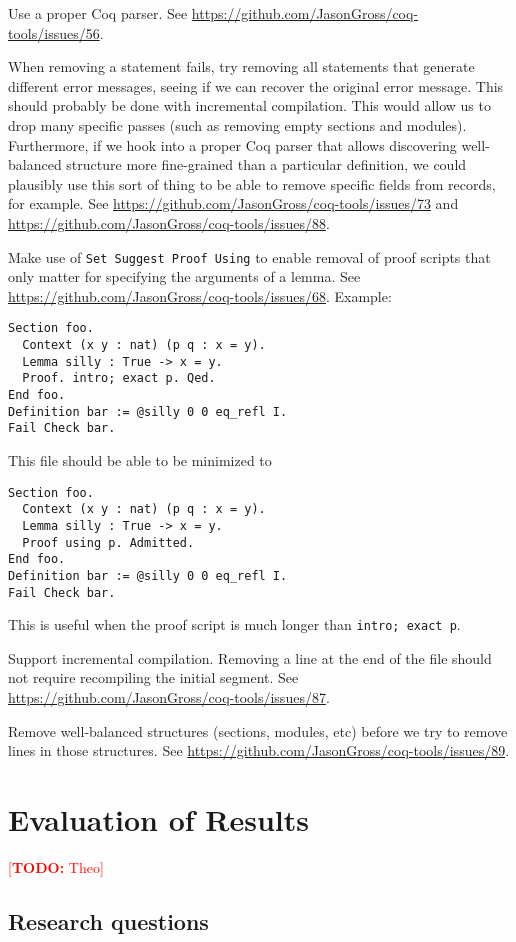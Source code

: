 \documentclass[a4paper,UKenglish,anonymous,cleveref,autoref,thm-restate]{lipics-v2021}
\makeatletter
\newcommand{\todo}[1]{%
\@latex@warning{TODO: \detokenize{#1} on page \thepage}%
\textcolor{red}{[\textbf{TODO:} #1]}}%
\makeatother
\begin{document}
Use a proper Coq parser.
See \url{https://github.com/JasonGross/coq-tools/issues/56}.

When removing a statement fails, try removing all statements that generate different error messages, seeing if we can recover the original error message.
This should probably be done with incremental compilation.
This would allow us to drop many specific passes (such as removing empty sections and modules).
Furthermore, if we hook into a proper Coq parser that allows discovering well-balanced structure more fine-grained than a particular definition, we could plausibly use this sort of thing to be able to remove specific fields from records, for example.
See \url{https://github.com/JasonGross/coq-tools/issues/73} and \url{https://github.com/JasonGross/coq-tools/issues/88}.

Make use of \verb|Set Suggest Proof Using| to enable removal of proof scripts that only matter for specifying the arguments of a lemma.
See \url{https://github.com/JasonGross/coq-tools/issues/68}.
Example:
\begin{verbatim}
Section foo.
  Context (x y : nat) (p q : x = y).
  Lemma silly : True -> x = y.
  Proof. intro; exact p. Qed.
End foo.
Definition bar := @silly 0 0 eq_refl I.
Fail Check bar.
\end{verbatim}
This file should be able to be minimized to
\begin{verbatim}
Section foo.
  Context (x y : nat) (p q : x = y).
  Lemma silly : True -> x = y.
  Proof using p. Admitted.
End foo.
Definition bar := @silly 0 0 eq_refl I.
Fail Check bar.
\end{verbatim}
This is useful when the proof script is much longer than \verb|intro; exact p|.

Support incremental compilation.
Removing a line at the end of the file should not require recompiling the initial segment.
See \url{https://github.com/JasonGross/coq-tools/issues/87}.

Remove well-balanced structures (sections, modules, etc) before we try to remove lines in those structures.
See \url{https://github.com/JasonGross/coq-tools/issues/89}.

\section{Evaluation of Results}

\todo{Theo}

\subsection{Research questions}
\end{document}
